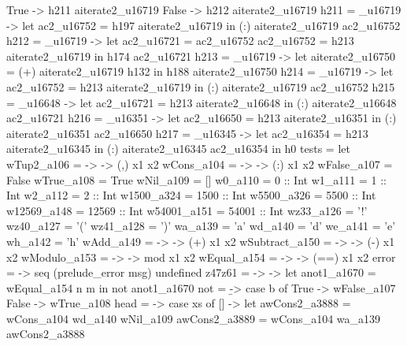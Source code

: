                                           True -> h211 aiterate2_u16719
                                          False -> h212 aiterate2_u16719
         h211 = _u16719 -> let ac2_u16752 = h197 aiterate2_u16719
                                     in (:) aiterate2_u16719 ac2_u16752
         h212 = _u16719 -> let
                                       ac2_u16721 = ac2_u16752
                                       ac2_u16752 = h213 aiterate2_u16719
                                     in h174 ac2_u16721
         h213 = _u16719 -> let
                                       aiterate2_u16750 = (+) aiterate2_u16719 h132
                                     in h188 aiterate2_u16750
         h214 = _u16719 -> let ac2_u16752 = h213 aiterate2_u16719
                                     in (:) aiterate2_u16719 ac2_u16752
         h215 = _u16648 -> let ac2_u16721 = h213 aiterate2_u16648
                                     in (:) aiterate2_u16648 ac2_u16721
         h216 = _u16351 -> let ac2_u16650 = h213 aiterate2_u16351
                                     in (:) aiterate2_u16351 ac2_u16650
         h217 = _u16345 -> let ac2_u16354 = h213 aiterate2_u16345
                                     in (:) aiterate2_u16345 ac2_u16354
       in h0
tests = let
          wTup2_a106 =  ->  -> (,) x1 x2
          wCons_a104 =  ->  -> (:) x1 x2
          wFalse_a107 = False
          wTrue_a108 = True
          wNil_a109 = []
          w0_a110 = 0 :: Int
          w1_a111 = 1 :: Int
          w2_a112 = 2 :: Int
          w1500_a324 = 1500 :: Int
          w5500_a326 = 5500 :: Int
          w12569_a148 = 12569 :: Int
          w54001_a151 = 54001 :: Int
          wz33_a126 = '!'
          wz40_a127 = '('
          wz41_a128 = ')'
          wa_a139 = 'a'
          wd_a140 = 'd'
          we_a141 = 'e'
          wh_a142 = 'h'
          wAdd_a149 =  ->  -> (+) x1 x2
          wSubtract_a150 =  ->  -> (-) x1 x2
          wModulo_a153 =  ->  -> mod x1 x2
          wEqual_a154 =  ->  -> (==) x1 x2
          error = \msg -> seq (prelude_error msg) undefined
          z47z61 = \n -> \m -> let anot1_a1670 = wEqual_a154 n m
                               in not anot1_a1670
          not = \b -> case b of
                        True -> wFalse_a107
                        False -> wTrue_a108
          head = \xs -> case xs of
                          [] ->
                            let
                              awCons2_a3888 = wCons_a104 wd_a140 wNil_a109
                              awCons2_a3889 = wCons_a104 wa_a139 awCons2_a3888
